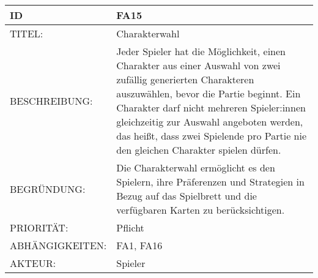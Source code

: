 \documentclass{uulm-assignment}
\begin{document}
    \begin{tabularx}{\textwidth}{|l|X |} \hline
        \textbf{ID} & \textbf{FA15} \\
        \hline
        TITEL: &  Charakterwahl\\
        \hline
        BESCHREIBUNG: & Jeder Spieler hat die Möglichkeit, einen Charakter aus einer Auswahl von zwei zufällig generierten Charakteren auszuwählen, bevor die Partie beginnt. Ein Charakter darf nicht mehreren Spieler:innen gleichzeitig zur Auswahl angeboten werden, das heißt, dass zwei Spielende pro Partie nie den gleichen Charakter spielen dürfen.
        \\
        \hline
        BEGRÜNDUNG: &   Die Charakterwahl ermöglicht es den Spielern, ihre Präferenzen und Strategien in Bezug auf das Spielbrett und die verfügbaren Karten zu berücksichtigen.\\
        \hline
        PRIORITÄT: & Pflicht\\
        \hline
        ABHÄNGIGKEITEN: & FA1, FA16\\
        \hline
        AKTEUR: & Spieler \\
        \hline
    \end{tabularx}
    
\end{document}
